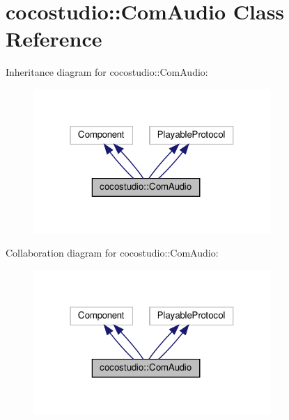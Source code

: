 \hypertarget{classcocostudio_1_1ComAudio}{}\section{cocostudio\+:\+:Com\+Audio Class Reference}
\label{classcocostudio_1_1ComAudio}


Inheritance diagram for cocostudio\+:\+:Com\+Audio\+:
\nopagebreak
\begin{figure}[H]
\begin{center}
\leavevmode
\includegraphics[width=256pt]{classcocostudio_1_1ComAudio__inherit__graph}
\end{center}
\end{figure}


Collaboration diagram for cocostudio\+:\+:Com\+Audio\+:
\nopagebreak
\begin{figure}[H]
\begin{center}
\leavevmode
\includegraphics[width=256pt]{classcocostudio_1_1ComAudio__coll__graph}
\end{center}
\end{figure}
